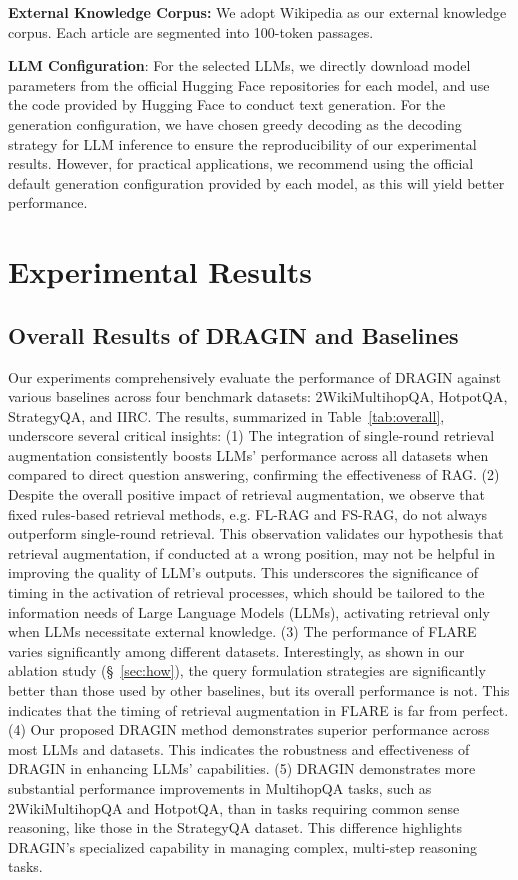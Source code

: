 \noindent \textbf{External Knowledge Corpus:}
We adopt Wikipedia as our external knowledge corpus. Each article are segmented into 100-token passages. 

\noindent \textbf{LLM Configuration}: For the selected LLMs, we directly download model parameters from the official Hugging Face repositories for each model, and use the code provided by Hugging Face to conduct text generation. For the generation configuration, we have chosen greedy decoding as the decoding strategy for LLM inference to ensure the reproducibility of our experimental results. However, for practical applications, we recommend using the official default generation configuration provided by each model, as this will yield better performance.

\section{Experimental Results}

\subsection{Overall Results of DRAGIN and Baselines}
Our experiments comprehensively evaluate the performance of DRAGIN against various baselines across four benchmark datasets: 2WikiMultihopQA, HotpotQA, StrategyQA, and IIRC. The results, summarized in Table~\ref{tab:overall}, underscore several critical insights:
(1) The integration of single-round retrieval augmentation consistently boosts LLMs' performance across all datasets when compared to direct question answering, confirming the effectiveness of RAG.
(2) Despite the overall positive impact of retrieval augmentation, we observe that fixed rules-based retrieval methods, e.g. FL-RAG and FS-RAG, do not always outperform single-round retrieval. This observation validates our hypothesis that retrieval augmentation, if conducted at a wrong position, may not be helpful in improving the quality of LLM's outputs.
This underscores the significance of timing in the activation of retrieval processes, which should be tailored to the information needs of Large Language Models (LLMs), activating retrieval only when LLMs necessitate external knowledge.
(3) The performance of FLARE varies significantly among different datasets. Interestingly, as shown in our ablation study (\S ~\ref{sec:how}), the query formulation strategies are significantly better than those used by other baselines, but its overall performance is not. This indicates that the timing of retrieval augmentation in FLARE is far from perfect.
(4) Our proposed DRAGIN method demonstrates superior performance across most LLMs and datasets. This indicates the robustness and effectiveness of DRAGIN in enhancing LLMs' capabilities.
(5) DRAGIN demonstrates more substantial performance improvements in MultihopQA tasks, such as 2WikiMultihopQA and HotpotQA, than in tasks requiring common sense reasoning, like those in the StrategyQA dataset. This difference highlights DRAGIN's specialized capability in managing complex, multi-step reasoning tasks.

